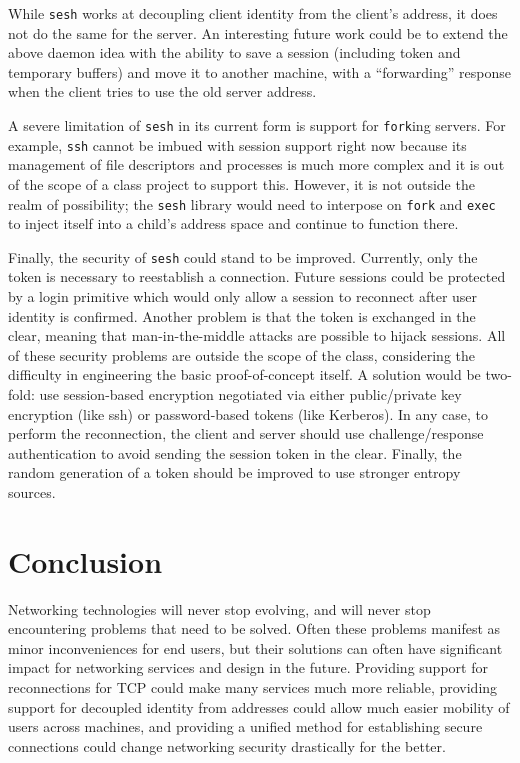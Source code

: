 \documentclass[twocolumn,11pt]{article}
\newcommand{\sesh}{\texttt{sesh}\xspace}
\begin{document}
While \sesh works at decoupling client identity from the client's address, it
does not do the same for the server. An interesting future work could be to
extend the above daemon idea with the ability to save a session (including token
and temporary buffers) and move it to another machine, with a
``forwarding'' response when the client tries to use the old server address.

A severe limitation of \sesh in its current form is support for \texttt{fork}ing
servers. For example, \texttt{ssh} cannot be imbued with session support right
now because its management of file descriptors and processes is much more
complex and it is out of the scope of a class project to support this. However,
it is not outside the realm of possibility; the \sesh library would need to
interpose on \texttt{fork} and \texttt{exec} to inject itself into a child's
address space and continue to function there.

Finally, the security of \sesh could stand to be improved. Currently, only the
token is necessary to reestablish a connection. Future sessions could be
protected by a login primitive which would only allow a session to reconnect
after user identity is confirmed. Another problem is that the token is exchanged
in the clear, meaning that man-in-the-middle attacks are possible to hijack
sessions. All of these security problems are outside the scope of the class,
considering the difficulty in engineering the basic proof-of-concept itself. A
solution would be two-fold: use session-based encryption negotiated via either
public/private key encryption (like ssh) or password-based tokens (like
Kerberos). In any case, to perform the reconnection, the client and server
should use challenge/response authentication to avoid sending the session token
in the clear. Finally, the random generation of a token should be improved to
use stronger entropy sources.

\section{Conclusion}

Networking technologies will never stop evolving, and will never stop
encountering problems that need to be solved. Often these problems manifest as
minor inconveniences for end users, but their solutions can often have
significant impact for networking services and design in the future. Providing
support for reconnections for TCP could make many services much more reliable,
providing support for decoupled identity from addresses could allow much easier
mobility of users across machines, and providing a unified method for
establishing secure connections could change networking security drastically for
the better.
\end{document}
